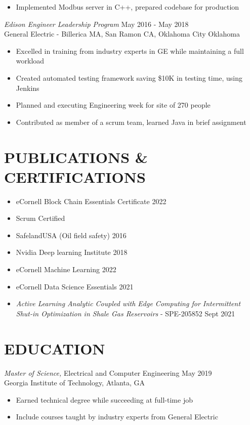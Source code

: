 \documentclass[line,margin]{res}
\begin{document}
\begin{resume}
\begin{itemize}
		\item Implemented Modbus server in C++, prepared codebase for production
	\end{itemize}
	{\sl Edison Engineer Leadership Program} \hfill May 2016 - May 2018\\
	General Electric - Billerica MA, San Ramon CA, Oklahoma City Oklahoma
	\begin{itemize} \itemsep -2pt
		\item Excelled in training from industry experts in GE while maintaining a full workload
		\item Created automated testing framework saving \$10K in testing time, using Jenkins
		\item Planned and executing Engineering week for site of 270 people
		\item Contributed as member of a scrum team, learned Java in brief assignment
	\end{itemize}

	\section{PUBLICATIONS \&\\CERTIFICATIONS}
	\begin{multicols}{2}
	\begin{itemize}
		\item eCornell Block Chain Essentials Certificate 2022
  		\item Scrum Certified
  		\item SafelandUSA (Oil field safety) 2016
  		\item Nvidia Deep learning Institute 2018
  		\item eCornell Machine Learning 2022
    	\item eCornell Data Science Essentials 2021
	\end{itemize}
	\end{multicols}
	\begin{itemize}
		\item {\sl Active Learning Analytic Coupled with Edge Computing for Intermittent Shut-in Optimization in Shale Gas Reservoirs} - SPE-205852 Sept 2021
	\end{itemize}

	\section{EDUCATION}
	{\sl Master of Science,} Electrical and Computer Engineering \hfill May 2019\\
   Georgia Institute of Technology, Atlanta, GA
   \begin{itemize} \itemsep -2pt %
	   \item Earned technical degree while succeeding at full-time job
	   \item Include courses taught by industry experts from General Electric
   \end{itemize}



\end{resume}
\end{document}
